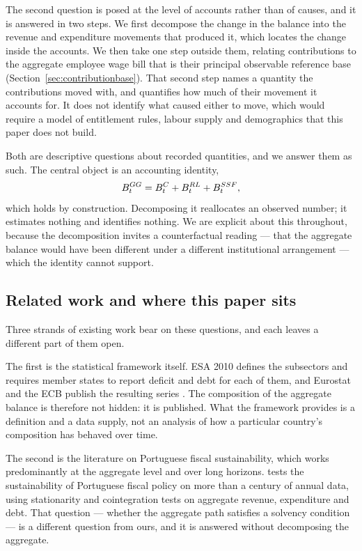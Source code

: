The second question is posed at the level of accounts rather than of causes, and it
is answered in two steps. We first decompose the change in the balance into the revenue
and expenditure movements that produced it, which locates the change inside the
accounts. We then take one step outside them, relating contributions to the aggregate
employee wage bill that is their principal observable reference base
(Section~\ref{sec:contributionbase}). That second step names a quantity the
contributions moved with, and quantifies how much of their movement it accounts for. It
does not identify what caused either to move, which would require a model of entitlement
rules, labour supply and demographics that this paper does not build.

Both are descriptive questions about recorded quantities, and we answer them as
such. The central object is an accounting identity,
\[
B^{GG}_t = B^{C}_t + B^{RL}_t + B^{SSF}_t,
\]
which holds by construction. Decomposing it reallocates an observed number; it
estimates nothing and identifies nothing. We are explicit about this throughout,
because the decomposition invites a counterfactual reading --- that the aggregate
balance would have been different under a different institutional arrangement ---
which the identity cannot support.

\subsection{Related work and where this paper sits}

Three strands of existing work bear on these questions, and each leaves a
different part of them open.

The first is the statistical framework itself. ESA 2010 defines the subsectors and
requires member states to report deficit and debt for each of them, and Eurostat
and the ECB publish the resulting series
\citep{eurostat_esa2010,eurostat_ssf_glossary,eurostat_gov_main,ecb_gfs}. The
composition of the aggregate balance is therefore not hidden: it is published. What
the framework provides is a definition and a data supply, not an analysis of how a
particular country's composition has behaved over time.

The second is the literature on Portuguese fiscal sustainability, which works
predominantly at the aggregate level and over long horizons.
\citet{marinheiro2006} tests the sustainability of Portuguese fiscal policy on more
than a century of annual data, using stationarity and cointegration tests on
aggregate revenue, expenditure and debt. That question --- whether the aggregate
path satisfies a solvency condition --- is a different question from ours, and it is
answered without decomposing the aggregate.

